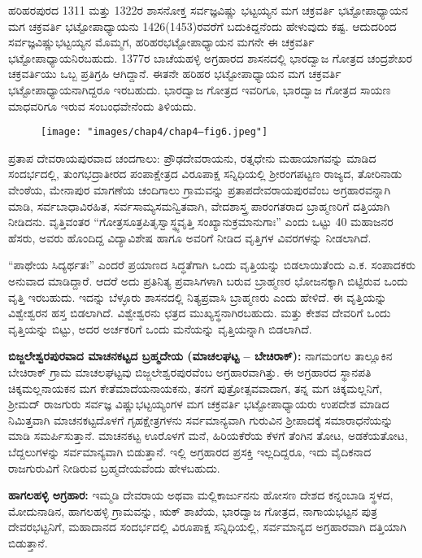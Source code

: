 ಹರಿಹರಪುರದ 1311 ಮತ್ತು 1322ರ ಶಾಸನೋಕ್ತ ಸರ್ವಜ್ಞವಿಷ್ಣು ಭಟ್ಟಯ್ಯನ ಮಗ ಚಕ್ರವರ್ತಿ ಭಟ್ಟೋಪಾಧ್ಯಾಯನ ಮಗ ಚಕ್ರವರ್ತಿ ಭಟ್ಟೋಪಾಧ್ಯಾಯನು 1426(1453)ರವರೆಗೆ ಬದುಕಿದ್ದನೆಂದು ಹೇಳುವುದು ಕಷ್ಟ. ಆದುದರಿಂದ ಸರ್ವಜ್ಞವಿಷ್ಣುಭಟ್ಟಯ್ಯನ ಮೊಮ್ಮಗ, ಹರಿಹರಭಟ್ಟೋಪಾಧ್ಯಾಯನ ಮಗನೇ ಈ ಚಕ್ರವರ್ತಿ ಭಟ್ಟೋಪಾಧ್ಯಾಯನಿರಬಹುದು. 1377ರ ಬಾಚೆಯಹಳ್ಳಿ ಅಗ್ರಹಾರದ ಶಾಸನದಲ್ಲಿ ಭಾರದ್ವಾಜ ಗೋತ್ರದ ಚಂದ್ರಶೇಖರ ಚಕ್ರವರ್ತಿಯು ಒಬ್ಬ ಪ್ರತಿಗ್ರಹಿ ಆಗಿದ್ದಾನೆ. ಈತನೇ ಹರಿಹರ ಭಟ್ಟೋಪಾಧ್ಯಾಯನ ಮಗ ಚಕ್ರವರ್ತಿ ಭಟ್ಟೋಪಾಧ್ಯಾಯನಾಗಿದ್ದರೂ ಇರಬಹುದು. ಭಾರದ್ವಾಜ ಗೋತ್ರದ ಇವರಿಗೂ, ಭಾರದ್ವಾಜ ಗೋತ್ರದ ಸಾಯಣ ಮಾಧವರಿಗೂ ಇರುವ ಸಂಬಂಧವೇನೆಂದು ತಿಳಿಯದು.

\begin{figure}[!h]
\texttt{[image: "images/chap4/chap4–fig6.jpeg"]}
\end{figure}

ಪ್ರತಾಪ ದೇವರಾಯಪುರವಾದ ಚಂದಗಾಲು: ಪ್ರೌಢದೇವರಾಯನು, ರತ್ನಧೇನು ಮಹಾಯಾಗವನ್ನು ಮಾಡಿದ ಸಂದರ್ಭದಲ್ಲಿ, ತುಂಗಭದ್ರಾತೀರದ ಪಂಪಾಕ್ಷೇತ್ರದ ವಿರೂಪಾಕ್ಷ ಸನ್ನಿಧಿಯಲ್ಲಿ ಶ‍್ರೀರಂಗಪಟ್ಟಣ ರಾಜ್ಯದ, ತೋರಿನಾಡು ವೇಂಠೆಯ, ಮೇನಾಪುರ ಮಾಗಣೆಯ ಚಂದಿಗಾಲು ಗ್ರಾಮವನ್ನು ಪ್ರತಾಪದೇವರಾಯಪುರವೆಂಬ ಅಗ್ರಹಾರವನ್ನಾಗಿ ಮಾಡಿ, ಸರ್ವಬಾಧಾವಿರಹಿತ, ಸರ್ವಸಾಮ್ಯಸಮನ್ವಿತವಾಗಿ, ವೇದಶಾಸ್ತ್ರ ಪಾರಂಗತರಾದ ಬ್ರಾಹ್ಮಣರಿಗೆ ದತ್ತಿಯಾಗಿ ನೀಡಿದನು. ವೃತ್ತಿವಂತರ “ಗೋತ್ರಸೂತ್ರಪಿತೃಸ್ವಾಸ್ಥ್ಯವೃತ್ತಿ ಸಂಖ್ಯಾನುಕ್ರಮಾನುಗಾಃ” ಎಂದು ಒಟ್ಟು 40 ಮಹಾಜನರ ಹೆಸರು, ಅವರು ಹೊಂದಿದ್ದ ವಿದ್ಯಾವಿಶೇಷ ಹಾಗೂ ಅವರಿಗೆ ನೀಡಿದ ವೃತ್ತಿಗಳ ವಿವರಗಳನ್ನು ನೀಡಲಾಗಿದೆ.

“ಪಾಥೇಯ ಸಿದ್ಯರ್ಥತಃ” ಎಂದರೆ ಪ್ರಯಾಣದ ಸಿದ್ಧತೆಗಾಗಿ ಒಂದು ವೃತ್ತಿಯನ್ನು ಬಿಡಲಾಯಿತೆಂದು ಎ.ಕ. ಸಂಪಾದಕರು ಅನುವಾದ ಮಾಡಿದ್ದಾರೆ. ಆದರೆ ಅದು ಪ್ರತಿನಿತ್ಯ ಪ್ರವಾಸಿಗಳಾಗಿ ಬರುವ ಬ್ರಾಹ್ಮಣರ ಭೋಜನಕ್ಕಾಗಿ ಬಿಟ್ಟಿರುವ ಒಂದು ವೃತ್ತಿ ಇರಬಹುದು. ಇದನ್ನು ಬೆಳ್ಳೂರು ಶಾಸನದಲ್ಲಿ ನಿತ್ಯಪ್ರವಾಸಿ ಬ್ರಾಹ್ಮಣರು ಎಂದು ಹೇಳಿದೆ. ಈ ವೃತ್ತಿಯನ್ನು ವಿಶ್ವೇಶ್ವರನ ಹಸ್ತ ಬಿಡಲಾಗಿದೆ. ವಿಶ್ವೇಶ್ವರನು ಛತ್ರದ ಮುಖ್ಯಸ್ಥನಾಗಿರಬಹುದು. ಮತ್ತು ಕೇಶವ ದೇವರಿಗೆ ಒಂದು ವೃತ್ತಿಯನ್ನು ಬಿಟ್ಟು, ಅದರ ಅರ್ಚಕರಿಗೆ ಒಂದು ಮನೆಯನ್ನು ವೃತ್ತಿಯನ್ನಾಗಿ ಬಿಡಲಾಗಿದೆ.

\textbf{ಬಿಜ್ಜಲೇಶ್ವರಪುರವಾದ ಮಾಚನಕಟ್ಟದ ಬ್ರಹ್ಮದೇಯ (ಮಾಚಲಘಟ್ಟ – ಬೇಚಿರಾಕ್​):} ನಾಗಮಂಗಲ ತಾಲ್ಲೂಕಿನ ಬೇಚಿರಾಕ್​ ಗ್ರಾಮ ಮಾಚಲಘಟ್ಟವು ಬಿಜ್ಜಲೇಶ್ವರಪುರವೆಂಬ ಅಗ್ರಹಾರವಾಗಿತ್ತು. ಈ ಅಗ್ರಹಾರದ ಸ್ಥಾನಪತಿ ಚಿಕ್ಕಮಲ್ಲನಾಯಕನ ಮಗ ಕೇತೆಮಾದೆಯನಾಯಕನು, ತನಗೆ ಪುತ್ರೋತ್ಸವವಾದಾಗ, ತನ್ನ ಮಗ ಚಿಕ್ಕಮಲ್ಲನಿಗೆ, ಶ‍್ರೀಮದ್​ ರಾಜಗುರು ಸರ್ವಜ್ಞ ವಿಷ್ಣುಭಟ್ಟಯ್ಯಂಗಳ ಮಗ ಚಕ್ರವರ್ತಿ ಭಟ್ಟೋಪಾಧ್ಯಾಯರು ಉಪದೇಶ ಮಾಡಿದ ನಿಮಿತ್ತವಾಗಿ ಮಾಚನಕಟ್ಟದೊಳಗೆ ಗೃಹಕ್ಷೇತ್ರಗಳನು ಸರ್ವಮಾನ್ಯವಾಗಿ ಗುರುವಿನ ಶ‍್ರೀಪಾದಕ್ಕೆ ಸಮಾರಾಧನೆಯನ್ನು ಮಾಡಿ ಸಮರ್ಪಿಸುತ್ತಾನೆ. ಮಾಚನಕಟ್ಟ ಊರೊಳಗೆ ಮನೆ, ಹಿರಿಯಕೆರೆಯ ಕೆಳಗೆ ತೆಂಗಿನ ತೋಟ, ಅಡಕೆಯತೋಟ, ಬೆದ್ದಲುಗಳನ್ನು ಸರ್ವಮಾನ್ಯವಾಗಿ ಬಿಡುತ್ತಾನೆ. ಇಲ್ಲಿ ಅಗ್ರಹಾರದ ಪ್ರಸಕ್ತಿ ಇಲ್ಲದಿದ್ದರೂ, ಇದು ವೈದಿಕನಾದ ರಾಜಗುರುವಿಗೆ ನೀಡಿರುವ ಬ್ರಹ್ಮದೇಯವೆಂದು ಹೇಳಬಹುದು.

\textbf{ಹಾಗಲಹಳ್ಳಿ ಅಗ್ರಹಾರ:} ಇಮ್ಮಡಿ ದೇವರಾಯ ಅಥವಾ ಮಲ್ಲಿಕಾರ್ಜುನನು ಹೋಸಣ ದೇಶದ ಕನ್ನಂಬಾಡಿ ಸ್ಥಳದ, ಮೋದುನಾಡಿನ, ಹಾಗಲಹಳ್ಳಿ ಗ್ರಾಮವನ್ನು, ಋಕ್​ ಶಾಖೆಯ, ಭಾರದ್ವಾಜ ಗೋತ್ರದ, ನಾಗಾಯಭಟ್ಟನ ಪುತ್ರ ದೇವರಭಟ್ಟನಿಗೆ, ಮಹಾದಾನದ ಸಂದರ್ಭದಲ್ಲಿ ವಿರೂಪಾಕ್ಷ ಸನ್ನಿಧಿಯಲ್ಲಿ, ಸರ್ವಮಾನ್ಯದ ಅಗ್ರಹಾರವಾಗಿ ದತ್ತಿಯಾಗಿ ಬಿಡುತ್ತಾನೆ.

